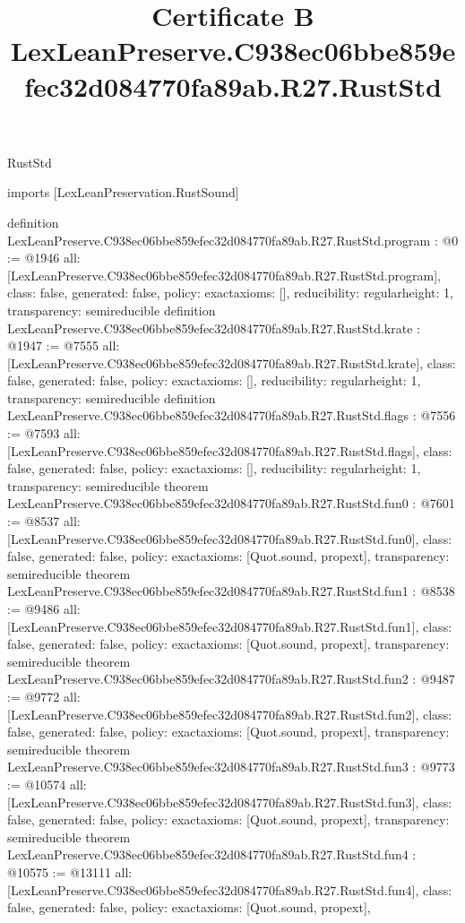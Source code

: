 \begin{lexlean}{RustStd}
\title{Certificate B LexLeanPreserve.C938ec06bbe859efec32d084770fa89ab.R27.RustStd}
\begin{coremodule}
imports [LexLeanPreservation.RustSound]

definition LexLeanPreserve.C938ec06bbe859efec32d084770fa89ab.R27.RustStd.program : @0 := @1946 {
  all: [LexLeanPreserve.C938ec06bbe859efec32d084770fa89ab.R27.RustStd.program],
  class: false,
  generated: false,
  policy: exact{axioms: []},
  reducibility: regular{height: 1},
  transparency: semireducible
}
definition LexLeanPreserve.C938ec06bbe859efec32d084770fa89ab.R27.RustStd.krate : @1947 := @7555 {
  all: [LexLeanPreserve.C938ec06bbe859efec32d084770fa89ab.R27.RustStd.krate],
  class: false,
  generated: false,
  policy: exact{axioms: []},
  reducibility: regular{height: 1},
  transparency: semireducible
}
definition LexLeanPreserve.C938ec06bbe859efec32d084770fa89ab.R27.RustStd.flags : @7556 := @7593 {
  all: [LexLeanPreserve.C938ec06bbe859efec32d084770fa89ab.R27.RustStd.flags],
  class: false,
  generated: false,
  policy: exact{axioms: []},
  reducibility: regular{height: 1},
  transparency: semireducible
}
theorem LexLeanPreserve.C938ec06bbe859efec32d084770fa89ab.R27.RustStd.fun0 : @7601 := @8537 {
  all: [LexLeanPreserve.C938ec06bbe859efec32d084770fa89ab.R27.RustStd.fun0],
  class: false,
  generated: false,
  policy: exact{axioms: [Quot.sound, propext]},
  transparency: semireducible
}
theorem LexLeanPreserve.C938ec06bbe859efec32d084770fa89ab.R27.RustStd.fun1 : @8538 := @9486 {
  all: [LexLeanPreserve.C938ec06bbe859efec32d084770fa89ab.R27.RustStd.fun1],
  class: false,
  generated: false,
  policy: exact{axioms: [Quot.sound, propext]},
  transparency: semireducible
}
theorem LexLeanPreserve.C938ec06bbe859efec32d084770fa89ab.R27.RustStd.fun2 : @9487 := @9772 {
  all: [LexLeanPreserve.C938ec06bbe859efec32d084770fa89ab.R27.RustStd.fun2],
  class: false,
  generated: false,
  policy: exact{axioms: [Quot.sound, propext]},
  transparency: semireducible
}
theorem LexLeanPreserve.C938ec06bbe859efec32d084770fa89ab.R27.RustStd.fun3 : @9773 := @10574 {
  all: [LexLeanPreserve.C938ec06bbe859efec32d084770fa89ab.R27.RustStd.fun3],
  class: false,
  generated: false,
  policy: exact{axioms: [Quot.sound, propext]},
  transparency: semireducible
}
theorem LexLeanPreserve.C938ec06bbe859efec32d084770fa89ab.R27.RustStd.fun4 : @10575 := @13111 {
  all: [LexLeanPreserve.C938ec06bbe859efec32d084770fa89ab.R27.RustStd.fun4],
  class: false,
  generated: false,
  policy: exact{axioms: [Quot.sound, propext]},
}
\end{coremodule}
\end{lexlean}
